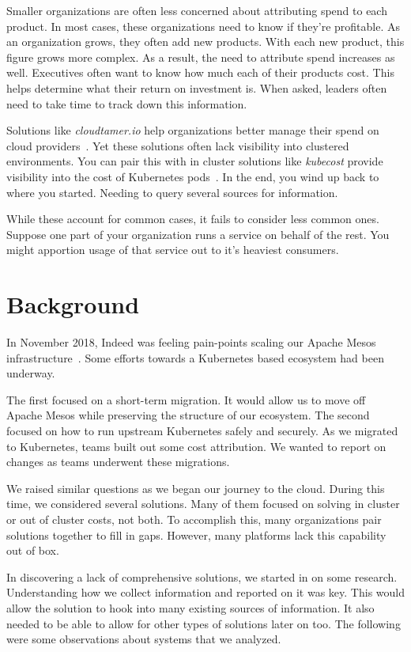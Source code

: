 \documentclass[10pt, a4paper, twocolumn]{article}
\begin{document}
  Smaller organizations are often less concerned about attributing spend to each product.
  In most cases, these organizations need to know if they're profitable.
  As an organization grows, they often add new products.
  With each new product, this figure grows more complex.
  As a result, the need to attribute spend increases as well.
  Executives often want to know how much each of their products cost.
  This helps determine what their return on investment is.
  When asked, leaders often need to take time to track down this information.

  Solutions like \textit{cloudtamer.io} help organizations better manage their spend on cloud providers~\cite{cloudtamer}.
  Yet these solutions often lack visibility into clustered environments.
  You can pair this with in cluster solutions like \textit{kubecost} provide visibility into the cost of Kubernetes pods~\cite{kubecost}.
  In the end, you wind up back to where you started.
  Needing to query several sources for information.

  While these account for common cases, it fails to consider less common ones.
  Suppose one part of your organization runs a service on behalf of the rest.
  You might apportion usage of that service out to it's heaviest consumers.


\section*{Background}
  In November 2018, Indeed was feeling pain-points scaling our Apache Mesos infrastructure~\cite{mesos}.
  Some efforts towards a Kubernetes based ecosystem had been underway.

  The first focused on a short-term migration.
  It would allow us to move off Apache Mesos while preserving the structure of our ecosystem.
  The second focused on how to run upstream Kubernetes safely and securely.
  As we migrated to Kubernetes, teams built out some cost attribution.
  We wanted to report on changes as teams underwent these migrations.

  We raised similar questions as we began our journey to the cloud.
  During this time, we considered several solutions.
  Many of them focused on solving in cluster or out of cluster costs, not both.
  To accomplish this, many organizations pair solutions together to fill in gaps.
  However, many platforms lack this capability out of box.

  In discovering a lack of comprehensive solutions, we started in on some research.
  Understanding how we collect information and reported on it was key.
  This would allow the solution to hook into many existing sources of information.
  It also needed to be able to allow for other types of solutions later on too.
  The following were some observations about systems that we analyzed.
\end{document}
